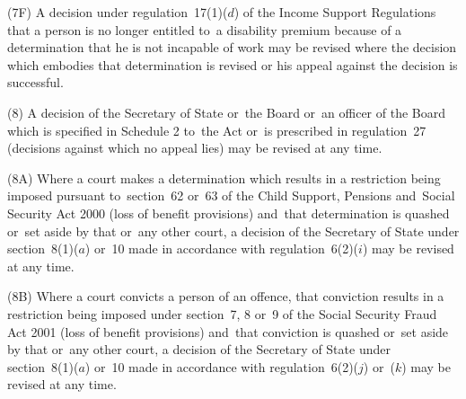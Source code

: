 \documentclass[12pt,a4paper]{article}
\begin{document}
(7F) A decision under regulation~17(1)($d$)  of the Income Support Regulations that a person is no longer entitled to~a disability premium because of a determination that he is not incapable of work may be revised where the decision which embodies that determination is revised or his appeal against the decision is successful.

(8) A decision of the Secretary of State 
or~the Board or~an officer of the Board  %
which is specified in Schedule 2 to~the Act or~is prescribed in regulation~27 (decisions against which no appeal lies) may be revised at any time.

(8A) Where a court makes a determination which results in a restriction being imposed pursuant to~section~62 or~63 of the Child Support, Pensions and~Social Security Act 2000 (loss of benefit provisions) and~that determination is quashed or~set aside by that or~any other court, a decision of the Secretary of State under section~8(1)($a$)  or~10 made in accordance with regulation~6(2)($i$) may be revised at any time.

(8B) Where a court convicts a person of an offence, that conviction results in a restriction being imposed under section~7, 8 or~9 of the Social Security Fraud Act 2001 (loss of benefit provisions) and~that conviction is quashed or~set aside by that or~any other court, a decision of the Secretary of State under section~8(1)($a$)  or~10 made in accordance with regulation~6(2)($j$)  or~($k$)  may be revised at any time.

\end{document}
